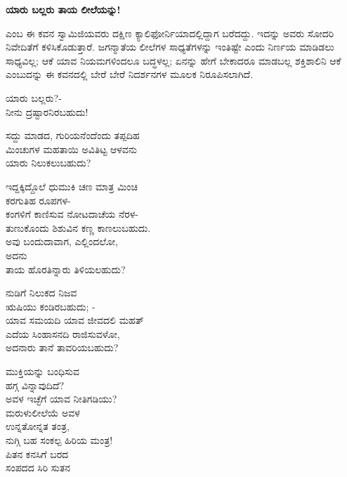 \selectkan

\begin{center}
\textbf{ಯಾರು ಬಲ್ಲರು ತಾಯ ಲೀಲೆಯನ್ನು!}
\end{center}

 ಎಂಬ ಈ ಕವನ ಸ್ವಾಮಿಜಿಯವರು ದಕ್ಷಿಣ ಕ್ಯಾಲಿಫೋರ್ನಿಯಾದಲ್ಲಿದ್ದಾಗ ಬರೆದದ್ದು. ಇದನ್ನು ಅವರು ಸೋದರಿ ನಿವೇದಿತೆಗೆ ಕಳಿಸಿಕೊಡುತ್ತಾರೆ. ಜಗನ್ಮಾತೆಯ ಲೀಲೆಗಳ ಸಾಧ್ಯತೆಗಳನ್ನು ಇಂತಿಷ್ಟೇ ಎಂದು ನಿರ್ಣಯ ಮಾಡಿಡಲು ಸಾಧ್ಯವಿಲ್ಲ; ಆಕೆ ಯಾವ ನಿಯಮಗಳಿಂದಲೂ ಬದ್ಧಳಲ್ಲ; ಏನನ್ನು ಹೇಗೆ ಬೇಕಾದರೂ ಮಾಡಬಲ್ಲ ಶಕ್ತಿಶಾಲಿನಿ ಆಕೆ ಎಂಬುದನ್ನು ಈ ಕವನದಲ್ಲಿ ಬೇರೆ ಬೇರೆ ನಿದರ್ಶನಗಳ ಮೂಲಕ ನಿರೂಪಿಸಲಾಗಿದೆ.

ಯಾರು ಬಲ್ಲರು?-\\ನೀನು ದ್ರಷ್ಟಾರನಿರಬಹುದು!

\begin{myquote}
ಸದ್ದು ಮಾಡದ, ಗುರಿಯನೆಂದೆಂದು ತಪ್ಪದಿಹ\\ಮಿಂಚುಗಳ ಮಹತಾಯಿ ಅವಿತಿಟ್ಟ ಆಳವನು\\ಯಾರು ನಿಲುಕಲುಬಹುದು?
\end{myquote}

\begin{myquote}
ಇದ್ದಕ್ಕಿದ್ದೊಲೆ ಧುಮುಕಿ ಚಣ ಮಾತ್ರ ಮಿಂಚಿ\\ಕರಗುತಿಹ ರೂಪಗಳ-\\ಕಂಗಳಿಗೆ ಕಾಣಿಸುವ ನೋಟದಾಚೆಯ ನೆರಳ-\\ತುಣುಕೊಂದು ಶಿಶುವಿನ ಕಣ್ಣ ಕಾಣಲುಬಹುದು.\\ಅವು ಬಂದುದಾವಾಗ, ಎಲ್ಲಿಂದಲೋ,\\ಅದನು\\ತಾಯ ಹೊರತಿನ್ನಾರು ತಿಳಿಯಲಹುದು?
\end{myquote}

\begin{myquote}
ನುಡಿಗೆ ನಿಲುಕದ ನಿಜವ\\ಋಷಿಯು ಕಂಡಿರಬಹುದು; -\\ಯಾವ ಸಮಯದಿ ಯಾವ ಜೀವದಲಿ ಮಹತ್\\ಎದೆಯ ಸಿಂಹಾಸನದಿ ರಾಜಿಸುವಳೋ,\\ಅದನಾರು ತಾನೆ ತಾವರಿಯಬಹುದು?
\end{myquote}

\begin{myquote}
ಮುಕ್ತಿಯನ್ನು ಬಂಧಿಸುವ\\ಹಗ್ಗ ವಿನ್ನಾವುದಿದೆ?\\ಅವಳ ಇಚ್ಛೆಗೆ ಯಾವ ನೀತಿಗಡಿಯು?\\ಮರುಳುಲೀಲೆಯೆ ಅವಳ\\ಉನ್ನತೋನ್ನತ ತಂತ್ರ,\\ನುಗ್ಗಿ ಬಹ ಸಂಕಲ್ಪ ಹಿರಿಯ ಮಂತ್ರ!\\ಪಿತನ ಕನಸಿಗೆ ಬರದ\\ಸಂಪದದ ಸಿರಿ ಸುತನ
\end{myquote}

